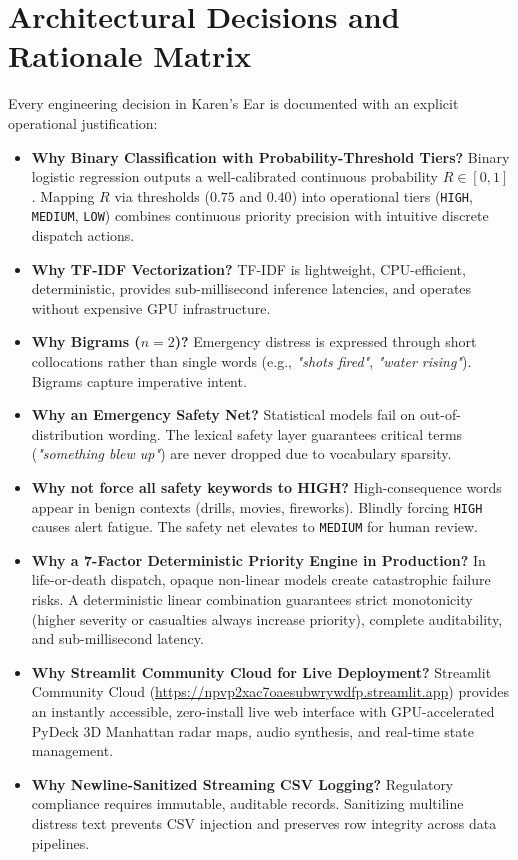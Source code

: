 \documentclass[10pt,a4paper]{article}
\begin{document}
\section{Architectural Decisions and Rationale Matrix}
Every engineering decision in Karen's Ear is documented with an explicit operational justification:
\begin{itemize}
  \item \textbf{Why Binary Classification with Probability-Threshold Tiers?} Binary logistic regression outputs a well-calibrated continuous probability $R \in [0, 1]$. Mapping $R$ via thresholds ($0.75$ and $0.40$) into operational tiers (\texttt{HIGH}, \texttt{MEDIUM}, \texttt{LOW}) combines continuous priority precision with intuitive discrete dispatch actions.
  \item \textbf{Why TF-IDF Vectorization?} TF-IDF is lightweight, CPU-efficient, deterministic, provides sub-millisecond inference latencies, and operates without expensive GPU infrastructure.
  \item \textbf{Why Bigrams ($n=2$)?} Emergency distress is expressed through short collocations rather than single words (e.g., \emph{"shots fired"}, \emph{"water rising"}). Bigrams capture imperative intent.
  \item \textbf{Why an Emergency Safety Net?} Statistical models fail on out-of-distribution wording. The lexical safety layer guarantees critical terms (\emph{"something blew up"}) are never dropped due to vocabulary sparsity.
  \item \textbf{Why not force all safety keywords to HIGH?} High-consequence words appear in benign contexts (drills, movies, fireworks). Blindly forcing \texttt{HIGH} causes alert fatigue. The safety net elevates to \texttt{MEDIUM} for human review.
  \item \textbf{Why a 7-Factor Deterministic Priority Engine in Production?} In life-or-death dispatch, opaque non-linear models create catastrophic failure risks. A deterministic linear combination guarantees strict monotonicity (higher severity or casualties always increase priority), complete auditability, and sub-millisecond latency.
  \item \textbf{Why Streamlit Community Cloud for Live Deployment?} Streamlit Community Cloud (\url{https://npvp2xac7oaesubwrywdfp.streamlit.app}) provides an instantly accessible, zero-install live web interface with GPU-accelerated PyDeck 3D Manhattan radar maps, audio synthesis, and real-time state management.
  \item \textbf{Why Newline-Sanitized Streaming CSV Logging?} Regulatory compliance requires immutable, auditable records. Sanitizing multiline distress text prevents CSV injection and preserves row integrity across data pipelines.
\end{itemize}
\end{document}
